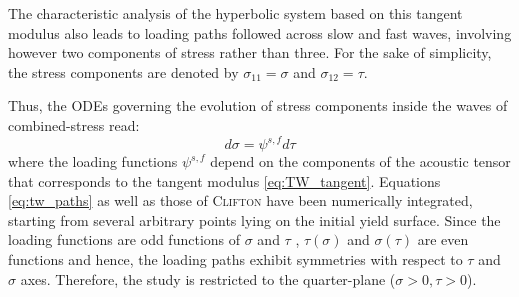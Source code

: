 The characteristic analysis of the hyperbolic system based on this tangent modulus also leads to loading paths followed across slow and fast waves, involving however two components of stress rather than three.
For the sake of simplicity, the stress components are denoted by $\sigma_{11}=\sigma$ and $\sigma_{12}=\tau$.

Thus, the ODEs governing the evolution of stress components inside the waves of combined-stress read: 
\begin{equation}
  \label{eq:tw_paths}
  d\sigma = \psi^{s,f} d\tau
\end{equation}
where the loading functions $\psi^{s,f}$ depend on the components of the acoustic tensor that corresponds to the tangent modulus \eqref{eq:TW_tangent}.
Equations \eqref{eq:tw_paths} as well as those of \textsc{Clifton} \cite{Clifton} have been numerically integrated, starting from several arbitrary points lying on the initial yield surface.
Since the loading functions are odd functions of $\sigma$ and $\tau$ \cite{Clifton}, $\tau(\sigma)$ and $\sigma(\tau)$ are even functions and hence, the loading paths exhibit symmetries with respect to $\tau$ and $\sigma$ axes.
Therefore, the study is restricted to the quarter-plane ($\sigma>0,\tau>0$).


